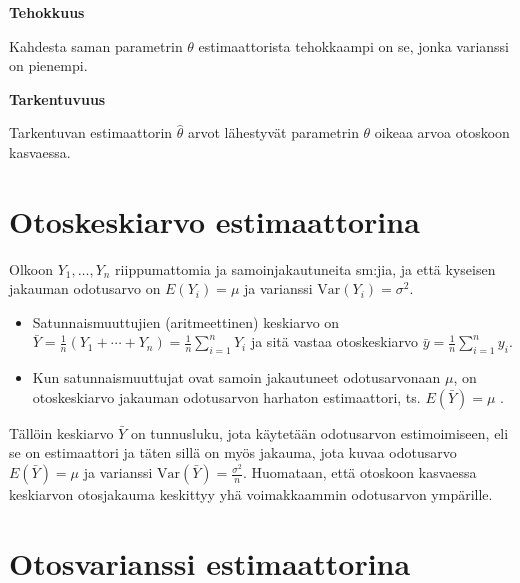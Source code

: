 \documentclass[
]{report}
\begin{document}
\begin{defblock}{}
\textbf{Tehokkuus}

Kahdesta saman parametrin \(\theta\) estimaattorista tehokkaampi on se,
jonka varianssi on pienempi.

\end{defblock}

\begin{defblock}{}
\textbf{Tarkentuvuus}

Tarkentuvan estimaattorin \(\widehat{\theta}\) arvot lähestyvät
parametrin \(\theta\) oikeaa arvoa otoskoon kasvaessa.

\end{defblock}

\hypertarget{otoskeskiarvo-estimaattorina}{%
\section{Otoskeskiarvo
estimaattorina}\label{otoskeskiarvo-estimaattorina}}

Olkoon \(Y_1,\dots,Y_n\) riippumattomia ja samoinjakautuneita sm:jia, ja
että kyseisen jakauman odotusarvo on \(E(Y_i) = \mu\) ja varianssi
\(\text{Var}(Y_i) = \sigma^2\).

\begin{itemize}
\item
  Satunnaismuuttujien (aritmeettinen) keskiarvo on
  \(\bar{Y} = \frac{1}{n}(Y_1 + \cdots + Y_n) = \frac{1}{n} \sum_{i=1}^n Y_i\)
  ja sitä vastaa otoskeskiarvo
  \(\bar{y} = \frac{1}{n}\sum_{i=1}^n y_i\).
\item
  Kun satunnaismuuttujat ovat samoin jakautuneet odotusarvonaan \(\mu\),
  on otoskeskiarvo jakauman odotusarvon harhaton estimaattori, ts.
  \(E(\bar{Y}) = \mu\) .
\end{itemize}

Tällöin keskiarvo \(\bar{Y}\) on tunnusluku, jota käytetään odotusarvon
estimoimiseen, eli se on estimaattori ja täten sillä on myös jakauma,
jota kuvaa odotusarvo \(E(\bar{Y}) = \mu\) ja varianssi
\(\text{Var}(\bar{Y}) = \frac{\sigma^2}{n}\). Huomataan, että otoskoon
kasvaessa keskiarvon otosjakauma keskittyy yhä voimakkaammin odotusarvon
ympärille.

\hypertarget{otosvarianssi-estimaattorina}{%
\section{Otosvarianssi
estimaattorina}\label{otosvarianssi-estimaattorina}}
\end{document}
